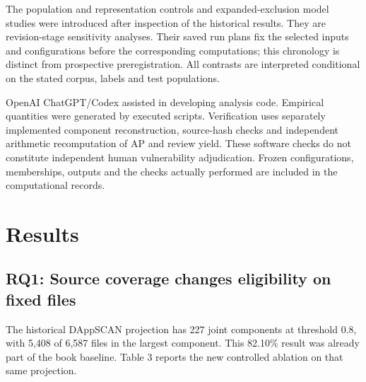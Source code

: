 \documentclass[preprint,12pt]{elsarticle}
\begin{document}
The population and representation controls and expanded-exclusion model studies were introduced after inspection of the historical results. They are revision-stage sensitivity analyses. Their saved run plans fix the selected inputs and configurations before the corresponding computations; this chronology is distinct from prospective preregistration. All contrasts are interpreted conditional on the stated corpus, labels and test populations.

OpenAI ChatGPT/Codex assisted in developing analysis code. Empirical quantities were generated by executed scripts. Verification uses separately implemented component reconstruction, source-hash checks and independent arithmetic recomputation of AP and review yield. These software checks do not constitute independent human vulnerability adjudication. Frozen configurations, memberships, outputs and the checks actually performed are included in the computational records.

\section{Results}\label{results}

\subsection{RQ1: Source coverage changes eligibility on fixed files}\label{rq1-source-coverage-changes-eligibility-on-fixed-files}

The historical DAppSCAN projection has 227 joint components at threshold 0.8, with 5,408 of 6,587 files in the largest component. This 82.10\% result was already part of the book baseline. Table 3 reports the new controlled ablation on that same projection.
\end{document}
